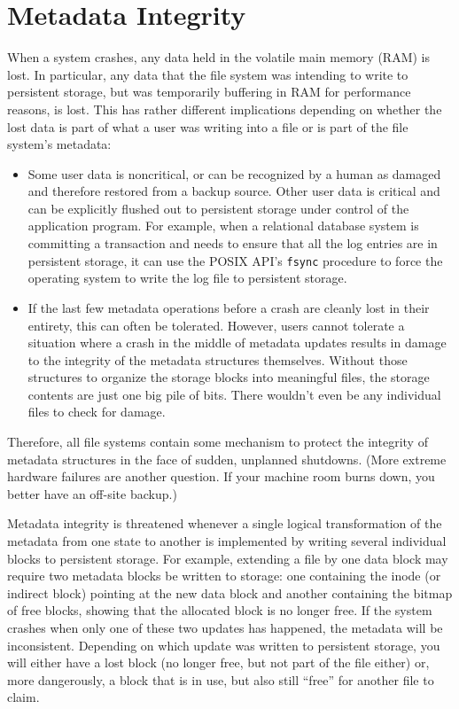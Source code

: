 \section{Metadata Integrity}\label{metadata-integrity-section}

When a system crashes, any data held in the volatile main memory (RAM)
is lost. In particular, any data that the file system was intending to
write to persistent storage, but was temporarily buffering in RAM for performance
reasons, is lost.  This has rather different implications depending on
whether the lost data is part of what a user was writing into a file
or is part of the file system's metadata:
\begin{itemize}
\item
Some user data is noncritical, or can be recognized by a human as
damaged and therefore restored from a backup source.  Other user data is critical and
can be explicitly flushed out to persistent storage under control of the application
program.  For example, when a relational database system is committing
a transaction and needs to ensure that all the log entries are in
persistent storage, it can use the POSIX API's \verb|fsync| procedure to force the
operating system to write the log file to persistent storage.
\item
If the last few metadata operations before a crash are
cleanly lost in their entirety, this can often be tolerated.  However,
users cannot tolerate a situation where a crash in the middle of metadata
updates results in damage to the integrity of the metadata structures
themselves.  Without those structures to organize the storage blocks into
meaningful files, the storage contents are just one big pile of bits.
There wouldn't even be any individual files to check for damage.
\end{itemize}
Therefore, all file systems contain some mechanism to protect the
integrity of metadata structures in the face of sudden, unplanned
shutdowns.  (More extreme hardware failures are another question.  If
your machine room burns down, you better have an off-site backup.)

Metadata integrity is threatened whenever a single logical
transformation of the metadata from one state to another is
implemented by writing several individual blocks to persistent storage.  For
example, extending a file by one data block may require two metadata
blocks be written to storage: one containing the inode (or indirect
block) pointing at the new data block and another containing the bitmap
of free blocks, showing that the allocated block is no longer free.
If the system crashes when only one of these two updates has happened,
the metadata will be inconsistent.  Depending on which update was
written to persistent storage, you will either have a lost block (no longer free, but
not part of the file either) or, more dangerously, a block that is in
use, but also still ``free'' for another file to claim.

